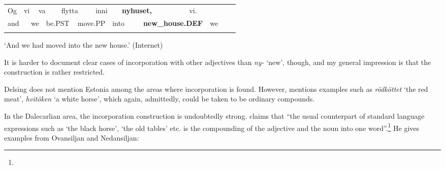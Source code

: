 \begin{tabular}{llllllllllllllll}
\lsptoprule
Og & \multicolumn{2}{l}{vi

} & \multicolumn{2}{l}{va

} & \multicolumn{2}{l}{flytta

} & \multicolumn{2}{l}{inni

} & \multicolumn{2}{l}{{\bfseries nyhuset,}

} & \multicolumn{2}{l}{vi.

} & \multicolumn{2}{l}{} & \\
\multicolumn{2}{l}{and

} & \multicolumn{2}{l}{we

} & \multicolumn{2}{l}{be.PST

} & \multicolumn{2}{l}{move.PP

} & \multicolumn{2}{l}{into

} & \multicolumn{2}{l}{{\bfseries new\_house.DEF}

} & \multicolumn{2}{l}{we

} & \multicolumn{2}{l}{}\\
\lspbottomrule
\end{tabular}

\begin{styleTranslation}
‘And we had moved into the new house.’ (Internet)

\end{styleTranslation}

\begin{styleBodyTextFirst}
It is harder to document clear cases of incorporation with other adjectives than \textit{ny-} ‘new’, though, and my general impression is that the construction is rather restricted.

\end{styleBodyTextFirst}

\begin{styleBodytextC}
Delsing does not mention Estonia among the areas where incorporation is found. However, \citet[98]{Tiberg1962} mentions examples such as \textit{rödköttet} ‘the red meat’, \textit{hvitöken} ‘a white horse’, which again, admittedly, could be taken to be ordinary compounds.

\end{styleBodytextC}

\begin{styleBodytextC}
In the Dalecarlian area, the incorporation construction is undoubtedly strong. \citet[148]{Levander1928} claims that “the usual counterpart of standard language expressions such as ‘the black horse’, ‘the old tables’ etc. is the compounding of the adjective and the noun into one word”.\footnote{} He gives examples from Ovansiljan and Nedansiljan: 

\end{styleBodytextC}

